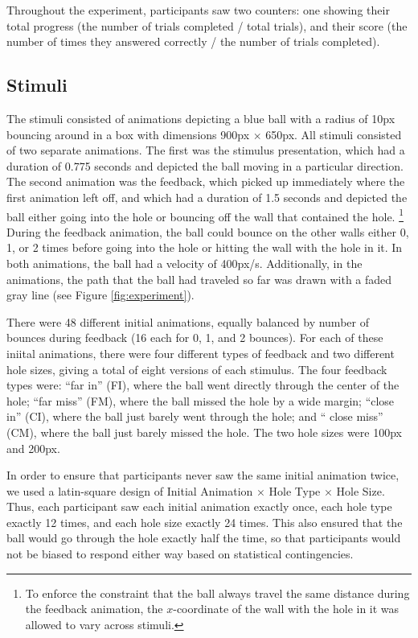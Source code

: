 \documentclass[10pt,letterpaper]{article}
\begin{document}
Throughout the experiment, participants saw two counters: one showing their total progress (the number of trials completed / total trials), and their score (the number of times they answered correctly / the number of trials completed).

\subsection{Stimuli}

The stimuli consisted of animations depicting a blue ball with a radius of 10px bouncing around in a box with dimensions 900px $\times$ 650px.
All stimuli consisted of two separate animations.
The first was the stimulus presentation, which had a duration of 0.775 seconds and depicted the ball moving in a particular direction.
The second animation was the feedback, which picked up immediately where the first animation left off, and which had a duration of 1.5 seconds and depicted the ball either going into the hole or bouncing off the wall that contained the hole.
\footnote{To enforce the constraint that the ball always travel the same distance during the feedback animation, the $x$-coordinate of the wall with the hole in it was allowed to vary across stimuli.}
During the feedback animation, the ball could bounce on the other walls either 0, 1, or 2 times before going into the hole or hitting the wall with the hole in it.
In both animations, the ball had a velocity of 400px/s.
Additionally, in the animations, the path that the ball had traveled so far was drawn with a faded gray line (see Figure \ref{fig:experiment}).

There were 48 different initial animations, equally balanced by number of bounces during feedback (16 each for 0, 1, and 2 bounces). 
For each of these iniital animations, there were four different types of feedback and two different hole sizes, giving a total of eight versions of each stimulus. 
The four feedback types were: ``far in'' (FI), where the ball went directly through the center of the hole; ``far miss'' (FM), where the ball missed the hole by a wide margin; ``close in'' (CI), where the ball just barely went through the hole; and `` close miss'' (CM), where the ball just barely missed the hole. 
The two hole sizes were 100px and 200px.

In order to ensure that participants never saw the same initial animation twice, we used a latin-square design of Initial Animation $\times$ Hole Type $\times$ Hole Size.
Thus, each participant saw each initial animation exactly once, each hole type exactly 12 times, and each hole size exactly 24 times.
This also ensured that the ball would go through the hole exactly half the time, so that participants would not be biased to respond either way based on statistical contingencies.
\end{document}
